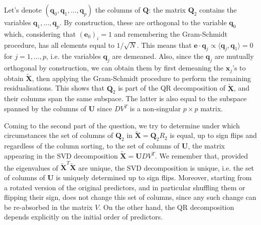 Let's denote $(\mathbf{q}_0, \mathbf{q}_1, \ldots, \mathbf{q}_p)$ the columns of $\mathbf{Q}$: the matrix $\mathbf{Q}_2$ contains the variables $\mathbf{q}_1, \ldots, \mathbf{q}_{p}$. By construction, these are orthogonal to the variable $\mathbf{q}_0$ which, considering that $(\mathbf{e}_{0})_i = 1$ and remembering
the Gram-Schmidt procedure, has all elements equal to $1/\sqrt{N}$. This means that $\mathbf{e} \cdot \mathbf{q}_j \propto \langle \mathbf{q}_j, \mathbf{q}_1 \rangle  = 0$ for $j = 1, \ldots, p$, i.e. the variables $\mathbf{q}_j$ are demeaned. Also, since the $\mathbf{q}_j$ are mutually orthogonal by construction, we can
obtain them by first demeaning the $\mathbf{x}_j$'s to obtain $\tilde{\mathbf{X}}$, then applying the Gram-Schmidt procedure to perform the remaining residualisations. This shows that $\mathbf{Q}_2$ is part
of the QR decomposition of $\tilde{\mathbf{X}}$, and their columns span the same subspace. The latter
is also equal to the subspace spanned by the columns of  $\mathbf{U}$ since $DV^T$ is a non-singular $p\times p$ matrix.

Coming to the second part of the question, we try to determine under which circumstances the set
of columns of $\mathbf{Q}_2$ in $\tilde{\mathbf{X}} = \mathbf{Q}_2 R_2$ is equal, up to sign flips
and regardless of the column sorting, to the set of columns of $\mathbf{U}$, the matrix appearing in
the SVD decomposition $\tilde{\mathbf{X}} = \mathbf{U} D V^T$. We remember that, provided the
eigenvalues of $\tilde{\mathbf{X}} ^T \tilde{\mathbf{X}}$ are unique, the SVD decomposition is unique,
i.e. the set of columns of $\mathbf{U}$ is uniquely determined up to sign flips. Moreover, starting from
a rotated version of the original predictors, and in particular shuffling them or flipping their sign, does not change this set of columns, since any such change can be re-absorbed in the matrix $V$. On the other
hand, the QR decomposition depends explicitly on the initial order of predictors.


